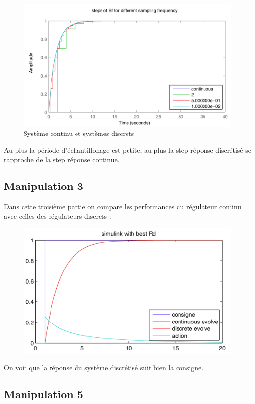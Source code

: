 \begin{figure}[!h]
\center\includegraphics[width=1\linewidth]{images/graph2_2.png}
\caption{Système continu et systèmes discrets}
\label{labo2-2}
\end{figure}
Au plus la période d'échantillonage est petite, au plus la step réponse discrétisé se rapproche de la step réponse continue. 

\newpage
\subsection{Manipulation 3}
Dans cette troisième partie on compare les performances du régulateur continu avec celles des régulateurs discrets :

\begin{figure}[!h]
\center\includegraphics[width=1\linewidth]{images/graph2_3.png}
\label{labo2-3}
\end{figure}
On voit que la réponse du système discrétisé suit bien la consigne.

\subsection{Manipulation 5}

